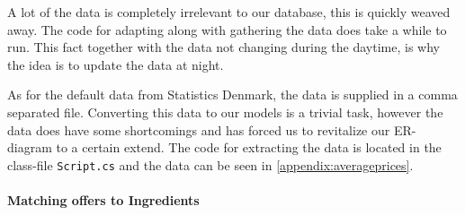 A lot of the data is completely irrelevant to our database, this is quickly weaved away. The code for adapting along with gathering the data does take a while to run. This fact together with the data not changing during the daytime, is why the idea is to update the data at night.

As for the default data from Statistics Denmark, the data is supplied in a comma separated file. Converting this data to our models is a trivial task, however the data does have some shortcomings and has forced us to revitalize our ER-diagram to a certain extend. The code for extracting the data is located in the class-file \texttt{Script.cs} and the data can be seen in \ref{appendix:averageprices}.

\paragraph{Matching offers to Ingredients}